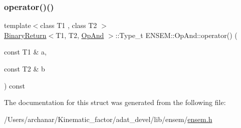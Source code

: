 \mbox{\label{structENSEM_1_1OpAnd_a05e5e9860556ea062a49cdb289806548}} 
\subsubsection{\texorpdfstring{operator()()}{operator()()}\hspace{0.1cm}{\footnotesize\ttfamily [2/2]}}
{\footnotesize\ttfamily template$<$class T1 , class T2 $>$ \\
\mbox{\hyperlink{structENSEM_1_1BinaryReturn}{Binary\+Return}}$<$T1, T2, \mbox{\hyperlink{structENSEM_1_1OpAnd}{Op\+And}} $>$\+::Type\+\_\+t E\+N\+S\+E\+M\+::\+Op\+And\+::operator() (\begin{DoxyParamCaption}\item[{const T1 \&}]{a,  }\item[{const T2 \&}]{b }\end{DoxyParamCaption}) const\hspace{0.3cm}{\ttfamily [inline]}}



The documentation for this struct was generated from the following file\+:\begin{DoxyCompactItemize}
\item 
/\+Users/archanar/\+Kinematic\+\_\+factor/adat\+\_\+devel/lib/ensem/\mbox{\hyperlink{lib_2ensem_2ensem_8h}{ensem.\+h}}\end{DoxyCompactItemize}
